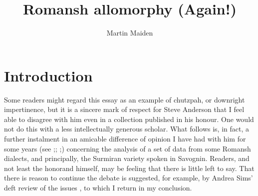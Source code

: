 \documentclass[output=paper,
modfonts
]{LSP/langsci}
\title{Romansh allomorphy (Again!)}
\author{Martin Maiden\affiliation{Oxford University}}
\begin{document}
\maketitle

\section{Introduction}\label{introduction}

Some readers might regard this essay as an example of chutzpah, or
downright impertinence, but it is a sincere mark of respect for Steve
Anderson that I feel able to disagree with him even in a collection
published in his honour. One would not do this with a less
intellectually generous scholar. What follows is, in fact, a further
instalment in an amicable difference of opinion I have had with him for
some years (see \citealt{anderson2008a};\citealt{anderson2011a}; \citealt{maiden2011a};\citealt{anderson2013stem}) concerning the analysis of a set of data from some Romansh
dialects, and principally, the Surmiran variety spoken in Savognin.
Readers, and not least the honorand himself, may be feeling that there
is little left to say. That there is reason to continue the debate is
suggested, for example, by Andrea Sims' deft review of the issues \citep[202--206]{Sims15:book}, to which I return in my conclusion.
\end{document}
